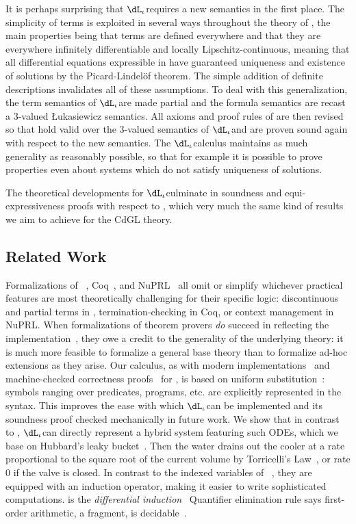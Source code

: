 \documentclass[12pt]{cmuthesis}
\theoremstyle{definition}
\theoremstyle{remark}
\newcommand{\CdGL}{\textsf{CdGL}\xspace}
\newcommand{\dLi}{\ensuremath{\dL_\iota}}
\begin{document}
It is perhaps surprising that \dLi requires a new semantics in the first place.
The simplicity of \dL terms is exploited in several ways throughout the theory of \dL, the main properties being that terms are defined everywhere and that they are everywhere infinitely differentiable and locally Lipschitz-continuous, meaning that all differential equations expressible in \dL have guaranteed uniqueness and existence of solutions by the Picard-Lindel\"of theorem.
The simple addition of definite descriptions invalidates all of these assumptions.
To deal with this generalization, the term semantics of \dLi are made partial and the formula semantics are recast a 3-valued {\L}ukasiewicz semantics.
All axioms and proof rules of \dL are then revised so that hold valid over the 3-valued semantics of \dLi and are proven sound again with respect to the new semantics.
The \dLi calculus maintains as much generality as reasonably possible, so that for example it is possible to prove properties even about systems which do not satisfy uniqueness of solutions.

The theoretical developments for \dLi culminate in soundness and equi-expressiveness proofs with respect to \dL, which very much the same kind of results we aim to achieve for the \CdGL theory.

\subsection{Related Work}
Formalizations of \KeYmaeraX~\cite{DBLP:conf/pldi/BohrerTMMP18}, Coq~\cite{DBLP:journals/jfrea/Barras10}, and NuPRL~\cite{DBLP:conf/itp/AnandR14} all omit or simplify whichever practical features are most theoretically challenging for their specific logic: discontinuous and partial terms in \KeYmaeraX, termination-checking in Coq, or context management in NuPRL.
When formalizations of theorem provers \emph{do} succeed in reflecting the implementation~\cite{DBLP:journals/jar/KumarAMO16}, they owe a credit to the generality of the underlying theory: it is much more feasible to formalize a general base theory than to formalize ad-hoc extensions as they arise.
Our calculus, as with modern implementations~\cite{DBLP:conf/cade/FultonMQVP15} and machine-checked correctness proofs~\cite{DBLP:conf/cpp/BohrerRVVP17} for \dL, is based on uniform substitution~\cite[\S35,\S40]{Church:1956}: symbols ranging over predicates, programs, etc. are explicitly represented in the syntax.
This improves the ease with which \dLi can be implemented and its soundness proof checked mechanically in future work.
We show that in contrast to \dL, \dLi can directly represent a hybrid system featuring such ODEs, which we base on Hubbard's leaky bucket~\cite[\S4.2]{Hubbard}.
Then the water drains out the cooler at a rate proportional to the square root of the current volume  by Torricelli's Law~\cite{driver1998torricelli}, or rate 0 if the valve is closed.
In contrast to the indexed variables of \QdL~\cite{DBLP:journals/lmcs/Platzer12b}, they are equipped with an induction operator, making it easier to write sophisticated computations.
 is the \emph{differential induction}~\cite{DBLP:journals/logcom/Platzer10}
Quantifier elimination rule  says first-order arithmetic, a fragment, is decidable~\cite{tarski1998decision}.
\end{document}
